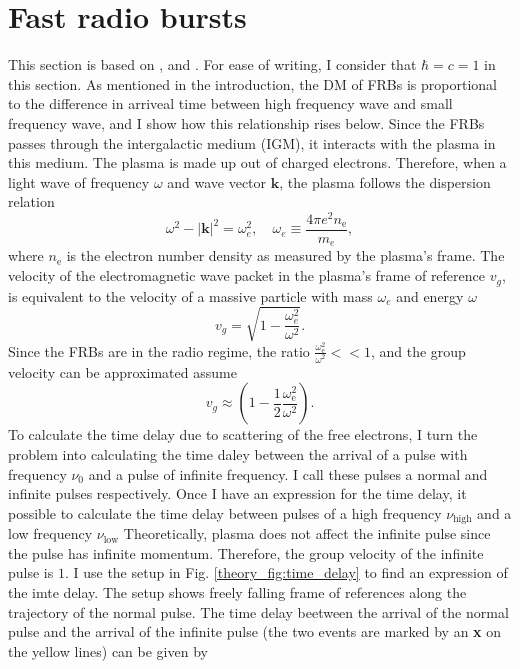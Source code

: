 \section{Fast radio bursts}\label{theory_sec:FRBs}
This section is based on \citet{alonso2021linear}, \citet{10.1093/mnras/stad1645} and \citet{Petroff_2019}. For ease of writing, I consider that $\hbar = c = 1$ in this section. As mentioned in the introduction, the DM of FRBs is proportional to the difference in arriveal time between high frequency wave and small frequency wave, and I show how this relationship rises below. Since the FRBs passes through the intergalactic medium (IGM), it interacts with the plasma in this medium. The plasma is made up out of charged electrons. Therefore, when a light wave of frequency $\omega$ and wave vector $\mathbf{k}$, the plasma follows the dispersion relation
\begin{equation}\label{eq:dispersion}
    \omega^2 - |\mathbf{k}|^2 = \omega_e^2, \quad \omega_e \equiv \frac{4\pi e^2 n_\mathrm{e}}{m_e},
\end{equation}
where $n_\mathrm{e}$ is the electron number density as measured by the plasma's frame. The velocity of the electromagnetic wave packet in the plasma's frame of reference $v_g$, is equivalent to the velocity of a massive particle with mass $\omega_e$ and energy $\omega$
\begin{equation}
    v_g = \sqrt{1 - \frac{\omega_e^2}{\omega^2}}.
\end{equation}
Since the FRBs are in the radio regime, the ratio $\frac{\omega_\mathrm{e}^2}{\omega^2} << 1$, and the group velocity can be approximated assume
\begin{equation}
    v_g \approx \left(1 - \frac{1}{2}\frac{\omega_\mathrm{e}^2}{\omega^2}\right).
\end{equation}
To calculate the time delay due to scattering of the free electrons, I turn the problem into calculating the time daley between the arrival of a pulse with frequency $\nu_0$ and a pulse of infinite frequency. I call these pulses a normal and infinite pulses respectively. Once I have an expression for the time delay, it possible to calculate the time delay between pulses of a high frequency $\nu_{\text{high}}$ and a low frequency $\nu_{\text{low}}$ Theoretically, plasma does not affect the infinite pulse since the pulse has infinite momentum. Therefore, the group velocity of the infinite pulse is $1$.
I use the setup in Fig. \ref{theory_fig:time_delay} to find an expression of the imte delay. The setup shows freely falling frame of references along the trajectory of the normal pulse. The time delay beetween the arrival of the normal pulse and the arrival of the infinite pulse (the two events are marked by an \textbf{x} on the yellow lines) can be given by 
